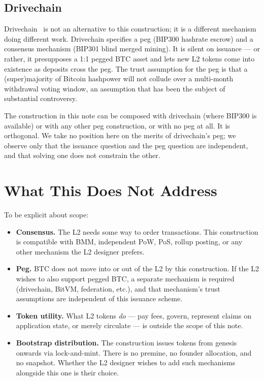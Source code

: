\documentclass[11pt,a4paper]{article}
\begin{document}
\subsection{Drivechain}

Drivechain~\cite{bip300,bip301} is not an alternative to this construction; it is a different mechanism doing different work. Drivechain specifies a peg (BIP300 hashrate escrow) and a consensus mechanism (BIP301 blind merged mining). It is silent on issuance --- or rather, it presupposes a 1:1 pegged BTC asset and lets new L2 tokens come into existence as deposits cross the peg. The trust assumption for the peg is that a (super)majority of Bitcoin hashpower will not collude over a multi-month withdrawal voting window, an assumption that has been the subject of substantial controversy.

The construction in this note can be composed with drivechain (where BIP300 is available) or with any other peg construction, or with no peg at all. It is orthogonal. We take no position here on the merits of drivechain's peg; we observe only that the issuance question and the peg question are independent, and that solving one does not constrain the other.
\fi

\section{What This Does Not Address}

To be explicit about scope:

\begin{itemize}[leftmargin=*]
  \item \textbf{Consensus.} The L2 needs some way to order transactions. This construction is compatible with BMM, independent PoW, PoS, rollup posting, or any other mechanism the L2 designer prefers.
  \item \textbf{Peg.} BTC does not move into or out of the L2 by this construction. If the L2 wishes to also support pegged BTC, a separate mechanism is required (drivechain, BitVM, federation, etc.), and that mechanism's trust assumptions are independent of this issuance scheme.
  \item \textbf{Token utility.} What L2 tokens \emph{do} --- pay fees, govern, represent claims on application state, or merely circulate --- is outside the scope of this note.
  \item \textbf{Bootstrap distribution.} The construction issues tokens from genesis onwards via lock-and-mint. There is no premine, no founder allocation, and no snapshot. Whether the L2 designer wishes to add such mechanisms alongside this one is their choice.
\end{itemize}
\end{document}
